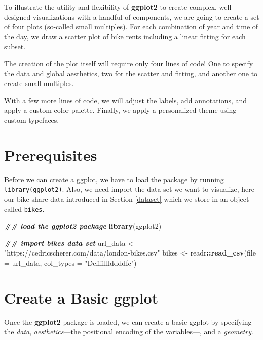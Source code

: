 \documentclass[
]{krantz}
\makeatletter
\newenvironment{Shaded}{\begin{snugshade}}{\end{snugshade}}
\newcommand{\AttributeTok}[1]{\textcolor[rgb]{0.27,0.27,0.27}{#1}}
\newcommand{\DocumentationTok}[1]{\textcolor[rgb]{0.37,0.37,0.37}{\textbf{\textit{#1}}}}
\newcommand{\FunctionTok}[1]{\textcolor[rgb]{0.27,0.27,0.27}{\textbf{#1}}}
\newcommand{\NormalTok}[1]{#1}
\newcommand{\OtherTok}[1]{\textcolor[rgb]{0.37,0.37,0.37}{#1}}
\newcommand{\SpecialCharTok}[1]{\textcolor[rgb]{0.43,0.43,0.43}{\textbf{#1}}}
\newcommand{\StringTok}[1]{\textcolor[rgb]{0.5,0.5,0.5}{#1}}
\newenvironment{kframe}{%
\medskip{}
\setlength{\fboxsep}{.8em}
 \def\at@end@of@kframe{}%
 \ifinner\ifhmode%
  \def\at@end@of@kframe{\end{minipage}}%
  \begin{minipage}{\columnwidth}%
 \fi\fi%
 \def\FrameCommand##1{\hskip\@totalleftmargin \hskip-\fboxsep
 \colorbox{shadecolor}{##1}\hskip-\fboxsep
     \hskip-\linewidth \hskip-\@totalleftmargin \hskip\columnwidth}%
 \MakeFramed {\advance\hsize-\width
   \@totalleftmargin\z@ \linewidth\hsize
   \@setminipage}}%
 {\par\unskip\endMakeFramed%
 \at@end@of@kframe}
\renewenvironment{Shaded}{\begin{kframe}}{\end{kframe}}
\makeatother
\begin{document}
To illustrate the utility and flexibility of \textbf{ggplot2} to create complex, well-designed visualizations with a handful of components, we are going to create a set of four plots (so-called small multiples). For each combination of year and time of the day, we draw a scatter plot of bike rents including a linear fitting for each subset.

The creation of the plot itself will require only four lines of code! One to specify the data and global aesthetics, two for the scatter and fitting, and another one to create small multiples.

With a few more lines of code, we will adjust the labels, add annotations, and apply a custom color palette. Finally, we apply a personalized theme using custom typefaces.

\hypertarget{prep-ggplot}{%
\section{Prerequisites}\label{prep-ggplot}}

Before we can create a ggplot, we have to load the package by running \texttt{library(ggplot2)}. Also, we need import the data set we want to visualize, here our bike share data introduced in Section \ref{dataset} which we store in an object called \texttt{bikes}.

\begin{Shaded}
\begin{Highlighting}[]
\DocumentationTok{\#\# load the ggplot2 package}
\FunctionTok{library}\NormalTok{(ggplot2)}

\DocumentationTok{\#\# import bikes data set}
\NormalTok{url\_data }\OtherTok{\textless{}{-}} \StringTok{"https://cedricscherer.com/data/london{-}bikes.csv"}
\NormalTok{bikes }\OtherTok{\textless{}{-}}\NormalTok{ readr}\SpecialCharTok{::}\FunctionTok{read\_csv}\NormalTok{(}\AttributeTok{file =}\NormalTok{ url\_data, }\AttributeTok{col\_types =} \StringTok{"Dcfffilllddddfc"}\NormalTok{)}
\end{Highlighting}
\end{Shaded}

\hypertarget{basics}{%
\section{Create a Basic ggplot}\label{basics}}

Once the \textbf{ggplot2} package is loaded, we can create a basic ggplot by specifying the \emph{data}, \emph{aesthetics}---the positional encoding of the variables---, and a \emph{geometry}.
\end{document}
